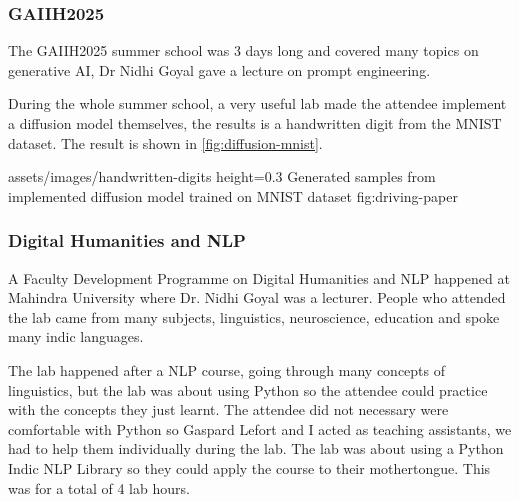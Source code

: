 \subsubsection{GAIIH2025}

The GAIIH2025\cite{gaiih2025} summer school was 3 days long and covered many
topics on generative AI, Dr Nidhi Goyal gave a lecture on prompt engineering.

During the whole summer school, a very useful lab made the attendee implement a
diffusion model themselves, the results is a handwritten digit from the
MNIST\cite{mnist} dataset. The result is shown in \cref{fig:diffusion-mnist}.

\insertfigure
    {assets/images/handwritten-digits}
    {height=0.3\textheight}
    {Generated samples from implemented diffusion model trained on MNIST dataset}
    {fig:driving-paper}

\subsubsection{Digital Humanities and NLP}

A Faculty Development Programme on Digital Humanities and NLP happened at
Mahindra University where Dr. Nidhi Goyal was a lecturer.  People who attended
the lab came from many subjects, linguistics, neuroscience, education and spoke
many indic languages.

The lab happened after a NLP course, going through many concepts of linguistics,
but the lab was about using Python so the attendee could practice with the
concepts they just learnt. The attendee did not necessary were comfortable with
Python so Gaspard Lefort and I acted as teaching assistants, we had to help them
individually during the lab. The lab was about using a Python Indic NLP Library
so they could apply the course to their mothertongue. This was for a total of 4
lab hours.
